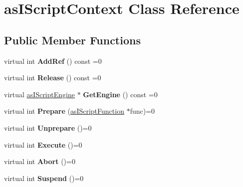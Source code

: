 \hypertarget{classas_i_script_context}{}\section{as\+I\+Script\+Context Class Reference}
\label{classas_i_script_context}
\subsection*{Public Member Functions}
\begin{DoxyCompactItemize}
\item 
\mbox{\label{classas_i_script_context_a5e24f4cb5773f732a1d46b818d963a1d}} 
virtual int {\bfseries Add\+Ref} () const =0
\item 
\mbox{\label{classas_i_script_context_a1b13a5f3e58627e9ff4300c0c6f0f3cf}} 
virtual int {\bfseries Release} () const =0
\item 
\mbox{\label{classas_i_script_context_a07f12016c5435aec5b63449abb6e4d8d}} 
virtual \hyperlink{classas_i_script_engine}{as\+I\+Script\+Engine} $\ast$ {\bfseries Get\+Engine} () const =0
\item 
\mbox{\label{classas_i_script_context_a43976f42dfc6c1af23e132d36265173a}} 
virtual int {\bfseries Prepare} (\hyperlink{classas_i_script_function}{as\+I\+Script\+Function} $\ast$func)=0
\item 
\mbox{\label{classas_i_script_context_ae3c18a2cc66c56f840e6ee4310287f65}} 
virtual int {\bfseries Unprepare} ()=0
\item 
\mbox{\label{classas_i_script_context_a8e52894432737acac2e1a422e496bf84}} 
virtual int {\bfseries Execute} ()=0
\item 
\mbox{\label{classas_i_script_context_a374befd21b8c14de81ef0ed9d2dea334}} 
virtual int {\bfseries Abort} ()=0
\item 
\mbox{\label{classas_i_script_context_ad4ac8be3586c46069b5870e40c86544a}} 
virtual int {\bfseries Suspend} ()=0

\end{DoxyCompactItemize}
